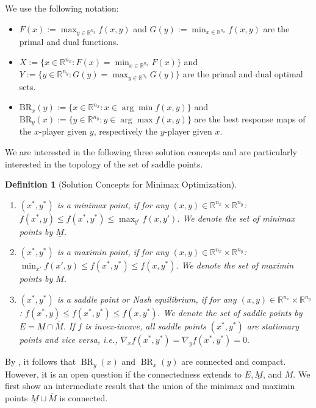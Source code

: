\documentclass{article}
\newtheorem{definition}{Definition}[section]
\newcommand{\R}{\mathbb{R}}
\DeclareMathOperator{\BR}{BR}
\begin{document}
\noindent We use the following notation:
\begin{itemize}
    \item $F(x) := \max_{y\in \R^{n_y}} f(x, y)$ and $G(y) := \min_{x\in \R^{n_x}} f(x,y)$ are the primal and dual functions.
    \item  $X := \{x\in \R^{n_x}: F(x) = \min_{x\in \R^{n_x}} F(x) \}$ and $Y:= \{y\in \R^{n_y}: G(y) =\max_{y\in \R^{n_y}} G(y)\}$ are the primal and dual optimal sets.
    \item $\text{BR}_x(y):=\{x\in \R^{n_x}:x\in \arg\min f(x,y)\}$ and $\text{BR}_y(x):=\{y\in \R^{n_y}:y\in \arg\max f(x,y)\}$ are the best response maps of the $x$-player given $y$, respectively the $y$-player given $x$. 
\end{itemize}

 We are interested in the following three solution concepts and are particularly interested in the topology of the set of saddle points.

\begin{definition}[Solution Concepts for Minimax Optimization]
\label{def:solution}
\noindent
\begin{enumerate}
    \item $(x^*, y^*)$ is a \emph{minimax point}, if for any $(x, y)\in \R^{n_x} \times \R^{n_y}$: $f(x^*, y) \leq f(x^*, y^*) \leq \max_{y'} f(x, y').$
    We denote the set of minimax points by $\underline{M}$.

    \item $(x^*, y^*)$ is a \emph{maximin point}, if for any $(x, y)\in \R^{n_x} \times \R^{n_y}$:
      $\min_{x'} f(x', y) \leq f(x^*, y^*) \leq f(x, y^*).$
    We denote the set of maximin points by $\overline{M}$.


    \item $(x^*, y^*)$ is a \emph{saddle point} or \emph{Nash equilibrium}, if for any $(x, y)\in \R^{n_x} \times \R^{n_y}$:
        $f(x^*, y) \leq f(x^*, y^*) \leq f(x, y^*).$ We denote the set of saddle points by $E= \underline{M} \cap \overline{M}$.  
        If $f$ is invex-incave, all saddle points $(x^*,y^*)$ are stationary points and vice versa, i.e., $ \nabla_x f(x^*, y^*) = \nabla_y f(x^*, y^*) = 0.$
\end{enumerate}

\end{definition}


By , it follows that $\BR_y(x)$ and $\BR_x(y)$ are connected and compact. However, it is an open question if the connectedness extends to $E,\underline{M}$, and $\overline{M}$. We first show an intermediate result that the union of the minimax and maximin points $\underline{M} \cup \overline{M}$ is connected. 
\end{document}
